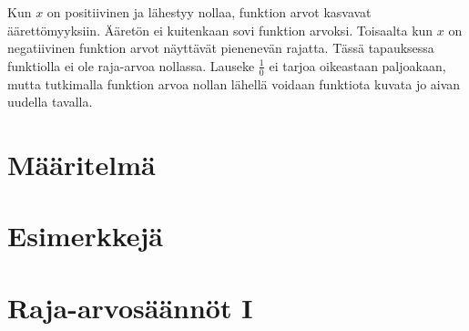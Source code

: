 \begin{center}
\end{center}

Kun $x$ on positiivinen ja lähestyy nollaa, funktion arvot kasvavat äärettömyyksiin. Ääretön ei kuitenkaan sovi funktion arvoksi. Toisaalta kun $x$ on negatiivinen funktion arvot näyttävät pienenevän rajatta. Tässä tapauksessa funktiolla ei ole raja-arvoa nollassa. Lauseke $\frac{1}{0}$ ei tarjoa oikeastaan paljoakaan, mutta tutkimalla funktion arvoa nollan lähellä voidaan funktiota kuvata jo aivan uudella tavalla.

\section{Määritelmä}


\section{Esimerkkejä}


\section{Raja-arvosäännöt I}

